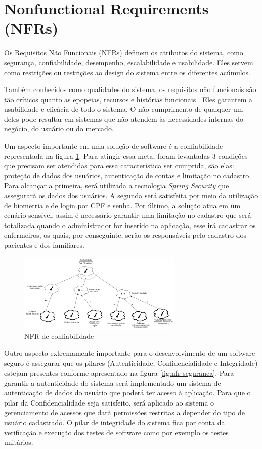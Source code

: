 \section{Nonfunctional Requirements (NFRs) }

Os Requisitos Não Funcionais (NFRs) definem os atributos do sistema, como segurança, confiabilidade, desempenho, escalabilidade e usabilidade. Eles servem como restrições ou restrições ao design do sistema entre os diferentes acúmulos.

Também conhecidos como qualidades do sistema, os requisitos não funcionais são tão críticos quanto as epopeias, recursos e histórias funcionais . Eles garantem a usabilidade e eficácia de todo o sistema. O não cumprimento de qualquer um deles pode resultar em sistemas que não atendem às necessidades internas do negócio, do usuário ou do mercado.

Um aspecto importante em uma solução de software é a confiabilidade representada na figura \ref{fig:nfr-confiabilidade}. Para atingir essa meta, foram levantadas 3 condições que precisam ser atendidas para essa característica ser cumprida, são elas: proteção de dados dos usuários, autenticação de contas e limitação no cadastro. Para alcançar a primeira, será utilizada a tecnologia \textit{Spring Security} que assegurará os dados dos usuários. A segunda será satisfeita por meio da utilização de biometria e de login por CPF e senha. Por último, a solução atua em um cenário sensível, assim é necessário garantir uma limitação no cadastro que será totalizada quando o administrador for inserido na aplicação, esse irá cadastrar os enfermeiros, os quais, por conseguinte, serão os responsáveis pelo cadastro dos pacientes e dos familiares. 

\begin{figure}[H]
    \centering
    \includegraphics[width=0.7\textwidth]{figuras/NFR_Confiabilidade.png}
    \caption{NFR de confiabilidade}
    \label{fig:nfr-confiabilidade}
\end{figure}

Outro aspecto extremamente importante para o desenvolvimento de um software seguro é assegurar que os pilares (Autenticidade, Confidencialidade e Integridade) estejam presentes conforme apresentado na figura \ref{fig:nfr-seguranca}. Para garantir a autenticidade do sistema será implementado um sistema de autenticação de dados do usuário que poderá ter acesso à aplicação. Para que o pilar da Confidencialidade seja satisfeito, será aplicado ao sistema o gerenciamento de acessos que dará permissões restritas a depender do tipo de usuário cadastrado. O pilar de integridade do sistema fica por conta da verificação e execução dos testes de software como por exemplo os testes unitários.

